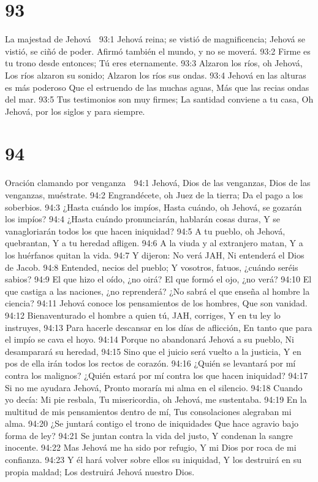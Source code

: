 \chapter{93}

La majestad de Jehová 

93:1 Jehová reina; se vistió de magnificencia; 
Jehová se vistió, se ciñó de poder. 
Afirmó también el mundo, y no se moverá. 
93:2 Firme es tu trono desde entonces; 
Tú eres eternamente. 
93:3 Alzaron los ríos, oh Jehová, 
Los ríos alzaron su sonido; 
Alzaron los ríos sus ondas. 
93:4 Jehová en las alturas es más poderoso 
Que el estruendo de las muchas aguas, 
Más que las recias ondas del mar. 
93:5 Tus testimonios son muy firmes; 
La santidad conviene a tu casa, 
Oh Jehová, por los siglos y para siempre. 

\chapter{94}

Oración clamando por venganza 

94:1 Jehová, Dios de las venganzas, 
Dios de las venganzas, muéstrate. 
94:2 Engrandécete, oh Juez de la tierra; 
Da el pago a los soberbios. 
94:3 ¿Hasta cuándo los impíos, 
Hasta cuándo, oh Jehová, se gozarán los impíos? 
94:4 ¿Hasta cuándo pronunciarán, hablarán cosas duras, 
Y se vanagloriarán todos los que hacen iniquidad? 
94:5 A tu pueblo, oh Jehová, quebrantan, 
Y a tu heredad afligen. 
94:6 A la viuda y al extranjero matan, 
Y a los huérfanos quitan la vida. 
94:7 Y dijeron: No verá JAH, 
Ni entenderá el Dios de Jacob. 
94:8 Entended, necios del pueblo; 
Y vosotros, fatuos, ¿cuándo seréis sabios? 
94:9 El que hizo el oído, ¿no oirá? 
El que formó el ojo, ¿no verá? 
94:10 El que castiga a las naciones, ¿no reprenderá? 
¿No sabrá el que enseña al hombre la ciencia? 
94:11 Jehová conoce los pensamientos de los hombres, 
Que son vanidad. 
94:12 Bienaventurado el hombre a quien tú, JAH, corriges, 
Y en tu ley lo instruyes, 
94:13 Para hacerle descansar en los días de aflicción, 
En tanto que para el impío se cava el hoyo. 
94:14 Porque no abandonará Jehová a su pueblo, 
Ni desamparará su heredad, 
94:15 Sino que el juicio será vuelto a la justicia, 
Y en pos de ella irán todos los rectos de corazón. 
94:16 ¿Quién se levantará por mí contra los malignos? 
¿Quién estará por mí contra los que hacen iniquidad? 
94:17 Si no me ayudara Jehová, 
Pronto moraría mi alma en el silencio. 
94:18 Cuando yo decía: Mi pie resbala, 
Tu misericordia, oh Jehová, me sustentaba. 
94:19 En la multitud de mis pensamientos dentro de mí, 
Tus consolaciones alegraban mi alma. 
94:20 ¿Se juntará contigo el trono de iniquidades 
Que hace agravio bajo forma de ley? 
94:21 Se juntan contra la vida del justo, 
Y condenan la sangre inocente. 
94:22 Mas Jehová me ha sido por refugio, 
Y mi Dios por roca de mi confianza. 
94:23 Y él hará volver sobre ellos su iniquidad, 
Y los destruirá en su propia maldad; 
Los destruirá Jehová nuestro Dios. 

